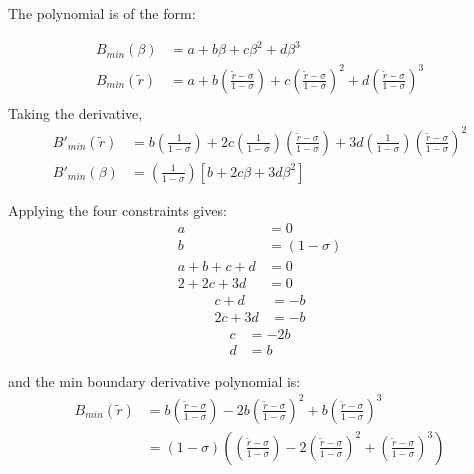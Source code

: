 \documentclass[a4paper]{article}
\begin{document}
The polynomial is of the form: 

\begin{align*}
    B_{min} \left( \beta \right) &= 
    a + b \beta + c \beta^2 + d \beta^3                   \\
    B_{min} \left( \widetilde{r} \right) &= 
    a + b \left( \frac{\widetilde{r} - \sigma}{1 - \sigma} \right)+
    c\left( \frac{\widetilde{r} - \sigma}{1 - \sigma} \right)  ^2+
    d\left( \frac{\widetilde{r} - \sigma}{1 - \sigma} \right)^3                    \\
\end{align*}
Taking the derivative,
\begin{align*}
    B'_{min} \left( \widetilde{r} \right) &= 
    b \left( \frac{1}{1 - \sigma} \right)+
    2 c\left( \frac{1}{1 - \sigma} \right)\left( \frac{\widetilde{r} - \sigma}{1 - \sigma} \right)  +
    3 d\left( \frac{1}{1-\sigma} \right)\left( \frac{\widetilde{r} - \sigma}{1 - \sigma} \right)^2\\
    B'_{min} \left( \beta \right) &= 
    \left( \frac{1}{1 - \sigma} \right)
    \left[
    b +
    2 c \beta + 
    3 d \beta^2
    \right]
\end{align*}


Applying the four constraints gives:
\begin{align*}
    a &= 0\\
    b &= \left( 1 - \sigma \right) \\
    a + b + c + d &= 0\\
    2 + 2c + 3d &= 0
\end{align*}
\begin{align*}
    c + d &= -b  \\
    2c + 3d &= -b
\end{align*}
\begin{align*}
    c &= -2b \\
    d &= b
\end{align*}

and the min boundary derivative polynomial is: 
\begin{align*}
    B_{min}\left( \widetilde{r} \right) &= 
    b \left( \frac{\widetilde{r} - \sigma }{1 - \sigma}\right) -
    2b\left( \frac{\widetilde{r} - \sigma }{1 - \sigma}\right) ^2 +
    b \left( \frac{\widetilde{r} - \sigma }{1 - \sigma}\right)^3 \\
    &=  \left( 1 - \sigma \right)
    \left( \left( \frac{\widetilde{r} - \sigma }{1 - \sigma}\right)  - 
    2\left( \frac{\widetilde{r} - \sigma }{1 - \sigma}\right)^2 +
    \left( \frac{\widetilde{r} - \sigma }{1 - \sigma}\right)^3\right)
\end{align*} 
\end{document}
